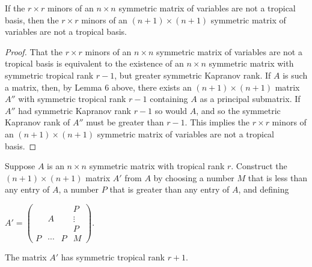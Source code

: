 \documentclass{article}
\begin{document}
\begin{cor}
  If the $r \times r$ minors of an $n \times n$ symmetric matrix of variables are not a tropical basis, then the $r \times r$ minors of an $(n+1) \times (n+1)$ symmetric matrix of variables are not a tropical basis.
\end{cor}

\begin{proof}
  That the $r \times r$ minors of an $n \times n$ symmetric matrix of variables are not a tropical basis is equivalent to the existence of an $n \times n$ symmetric matrix with symmetric tropical rank $r-1$, but greater symmetric Kapranov rank. If $A$ is such a matrix, then, by Lemma 6 above, there exists an $(n+1) \times (n+1)$ matrix $A''$ with symmetric tropical rank $r-1$ containing $A$ as a principal submatrix. If $A''$ had symmetric Kapranov rank $r-1$ so would $A$, and so the symmetric Kapranov rank of $A''$ must be greater than $r-1$. This implies the $r \times r$ minors of an $(n+1) \times (n+1)$ symmetric matrix of variables are not a tropical basis.
\end{proof}

\begin{lem}
  Suppose $A$ is an $n \times n$ symmetric matrix with tropical rank $r$. Construct the $(n+1) \times (n+1)$ matrix $A'$ from $A$ by choosing a number $M$ that is less than any entry of $A$, a number $P$ that is greater than any entry of $A$, and defining
  \begin{center}
    $A' = \left(\begin{array}{ccc|c} & & & P \\ & A & & \vdots \\ & & & P \\ \hline P & \cdots & P & M \end{array}\right)$.
  \end{center}
  The matrix $A'$ has symmetric tropical rank $r+1$.
\end{lem}
\end{document}
